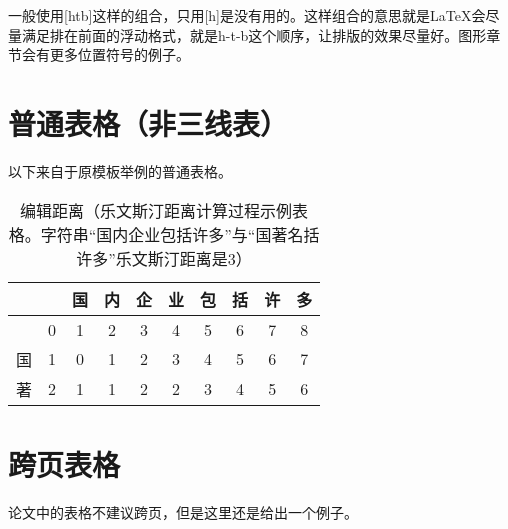 一般使用[htb]这样的组合，只用[h]是没有用的。这样组合的意思就是LaTeX会尽量满足排在前面的浮动格式，就是h-t-b这个顺序，让排版的效果尽量好。图形章节会有更多位置符号的例子。

\section{普通表格（非三线表）}

以下来自于原模板举例的普通表格。

\begin{table}[htbp]
	\small
	\setlength{\belowcaptionskip}{7pt}
	\centering
	\caption{编辑距离（乐文斯汀距离计算过程示例表格。字符串“国内企业包括许多”与“国著名括许多”乐文斯汀距离是3）}
	\label{table:ld}
	\vspace{0.2cm}
	\begin{tabular}{|c|c|c|c|c|c|c|c|c|c|}
		\hline
		&   & 国 & 内 & 企 & 业 & 包 & 括 & 许 & 多 \\
		\hline
		& 0 & 1 & 2 & 3 & 4 & 5 & 6 & 7 & 8 \\
		\hline
		国 & 1 & 0 & 1 & 2 & 3 & 4 & 5 & 6 & 7 \\
		\hline
		著 & 2 & 1 & 1 & 2 & 2 & 3 & 4 & 5 & 6 \\
		\hline
	\end{tabular}
\end{table}

\section{跨页表格}

论文中的表格不建议跨页，但是这里还是给出一个例子。

